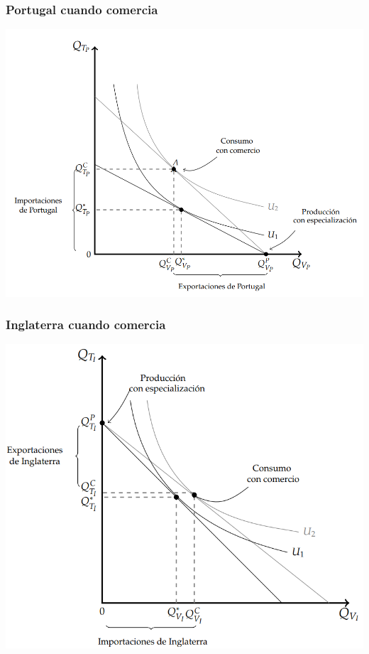 \documentclass{beamer}
\begin{document}
\begin{frame}
    \frametitle{Portugal cuando comercia}
    \centering
    \includegraphics[scale=0.5]{../Figures/C18.7.png}
\end{frame}

\begin{frame}
    \frametitle{Inglaterra cuando comercia}
    \centering
    \includegraphics[scale=0.5]{../Figures/C18.8.png}
\end{frame}
\end{document}
